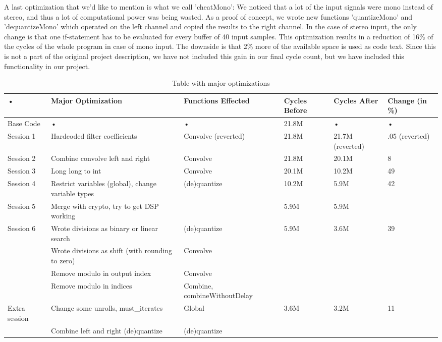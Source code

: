 \documentclass[a4paper]{article}
\begin{document}
A last optimization that we'd like to mention is what we call 'cheatMono': We noticed that a lot of the input signals were mono instead of stereo, and thus a lot of computational power was being wasted. As a proof of concept, we wrote new functions 'quantizeMono' and 'dequantizeMono' which operated on the left channel and copied the results to the right channel. In the case of stereo input, the only change is that one if-statement has to be evaluated for every buffer of 40 input samples. This optimization results in a reduction of 16\% of the cycles of the whole program in case of mono input. The downside is that 2\% more of the available space is used as code text. Since this is not a part of the original project description, we have not included this gain in our final cycle count, but we have included this functionality in our project. 

\begin{table}
\begin{tabular}{|p{2cm}|p{3cm}|p{3cm}|p{2cm}|p{2cm}|p{1cm}|}
\hline 
• & Major Optimization & Functions Effected & Cycles Before & Cycles After & Change (in \%) \\ 
\hline 
Base Code & • & • & 21.8M & • & • \\ 
\hline 
Session 1 & Hardcoded filter coefficients & Convolve (reverted) & 21.8M & 21.7M (reverted) & .05 (reverted)\\ 
\hline 
Session 2 & Combine convolve left and right & Convolve & 21.8M & 20.1M & 8 \\ 
\hline 
Session 3 & Long long to int & Convolve & 20.1M & 10.2M & 49 \\ 
\hline 
Session 4 & Restrict variables (global), change variable types & (de)quantize & 10.2M & 5.9M & 42 \\ 
\hline 
Session 5 & Merge with crypto, try to get DSP working & & 5.9M & 5.9M & \\
\hline
Session 6 & Wrote divisions as binary or linear search & (de)quantize & 5.9M & 3.6M & 39 \\
\hline
& Wrote divisions as shift (with rounding to zero) & Convolve & & & \\
\hline
& Remove modulo in output index & Convolve & & & \\
\hline
& Remove modulo in indices & Combine, combineWithoutDelay & & & \\
\hline
Extra session & Change some unrolls, must\_iterates & Global & 3.6M & 3.2M & 11 \\
\hline
& Combine left and right (de)quantize & (de)quantize & & & \\
\hline
\end{tabular} 
\caption{Table with major optimizations}
\label{table:optimizations}
\end{table}
\end{document}

